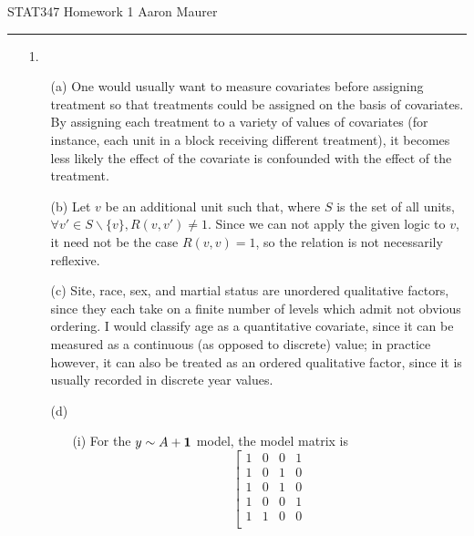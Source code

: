 \documentclass[11pt]{article}
\theoremstyle{definition}
\begin{document}
STAT347 Homework 1 \hfill Aaron Maurer
\vspace{2mm}
\hrule
\vspace{2mm}

\begin{itemize}
    \item[1.]
        \begin{itemize}
            \item[(a)] One would usually want to measure covariates before assigning treatment so that treatments could be assigned on the basis of covariates. By assigning each treatment to a variety of values of covariates (for instance, each unit in a block receiving different treatment), it becomes less likely the effect of the covariate is confounded with the effect of the treatment.
            \item[(b)] Let $v$ be an additional unit such that, where $S$ is the set of all units, \(\forall v' \in S\backslash \{v\}, R(v,v')\neq1\). Since we can not apply the given logic to $v$, it need not be the case \(R(v,v)=1\), so the relation is not necessarily reflexive. 
            \item[(c)] Site, race, sex, and martial status are unordered qualitative factors, since they each take on a finite number of levels which admit not obvious ordering. I would classify age as a quantitative covariate, since it can be measured as a continuous (as opposed to discrete) value; in practice however, it can also be treated as an ordered qualitative factor, since it is usually recorded in discrete year values.
            \item[(d)]
                \begin{itemize}
                    \item[(i)]
                        For the \(y\sim A + {\bf 1}\) model, the model matrix is
                        \[ \left[ \begin{array}{cccc} 1 & 0 & 0 & 1 \\
                                                      1 & 0 & 1 & 0 \\
                                                      1 & 0 & 1 & 0 \\
                                                      1 & 0 & 0 & 1 \\
                                                      1 & 1 & 0 & 0 \\

\end{array}\]
\end{itemize}
\end{itemize}
\end{itemize}
\end{document}
